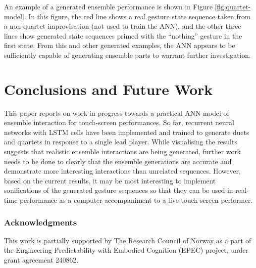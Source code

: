 \documentclass{article}
\begin{document}
An example of a generated ensemble performance is shown in Figure
\ref{fig:quartet-model}. In this figure, the red line shows a real
gesture state sequence taken from a non-quartet improvisation (not
used to train the ANN), and the other three lines show generated state
sequences primed with the ``nothing'' gesture in the first state. From
this and other generated examples, the ANN appears to be sufficiently
capable of generating ensemble parts to warrant further investigation.

\section{Conclusions and Future Work}

This paper reports on work-in-progress towards a practical ANN model
of ensemble interaction for touch-screen performances. So far,
recurrent neural networks with LSTM cells have been implemented and
trained to generate duets and quartets in response to a single lead
player. While visualising the results suggests that realistic ensemble
interactions are being generated, further work needs to be done to
clearly that the ensemble generations are accurate and demonstrate
more interesting interactions than unrelated sequences. However, based
on the current results, it may be most interesting to implement
sonifications of the generated gesture sequences so that they can be
used in real-time performance as a computer accompaniment to a live
touch-screen performer.

\subsubsection*{Acknowledgments}
This work is partially supported by The Research Council of Norway as
a part of the Engineering Predictability with Embodied Cognition
(EPEC) project, under grant agreement 240862.



\end{document}
